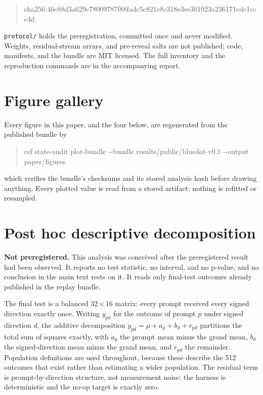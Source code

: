 \documentclass{article}
\begin{document}
\begin{quote}\ttfamily\small
sha256:46e88d3a629c78009787f88fadc5c821e8c318e3ee301923a236171cde1ece4d
\end{quote}

\noindent \texttt{protocol/} holds the preregistration, committed once and never modified. Weights,
residual-stream arrays, and pre-reveal salts are not published; code, manifests, and the bundle are
MIT licensed. The full inventory and the reproduction commands are in the accompanying report.

\clearpage

{\small


}


\clearpage

\appendix

\section{Figure gallery}
\label{app:figures}

Every figure in this paper, and the four below, are regenerated from the published bundle by

\begin{quote}\ttfamily\small
csf state-audit plot-bundle -{}-bundle results/public/bluedot-v0.1 -{}-output paper/figures
\end{quote}

\noindent which verifies the bundle's checksums and its stored analysis hash before drawing
anything. Every plotted value is read from a stored artifact; nothing is refitted or resampled.

\section{Post hoc descriptive decomposition}
\label{app:decomposition}

\textbf{Not preregistered.} This analysis was conceived after the preregistered result had been
observed. It reports no test statistic, no interval, and no p-value, and no conclusion in the main
text rests on it. It reads only final-test outcomes already published in the replay bundle.

The final test is a balanced $32 \times 16$ matrix: every prompt received every signed direction
exactly once. Writing $y_{pd}$ for the outcome of prompt $p$ under signed direction $d$, the
additive decomposition $y_{pd} = \mu + a_p + b_d + r_{pd}$ partitions the total sum of squares
exactly, with $a_p$ the prompt mean minus the grand mean, $b_d$ the signed-direction mean minus the
grand mean, and $r_{pd}$ the remainder. Population definitions are used throughout, because these
describe the 512 outcomes that exist rather than estimating a wider population. The residual term is
prompt-by-direction structure, not measurement noise: the harness is deterministic and the no-op
target is exactly zero.
\end{document}
